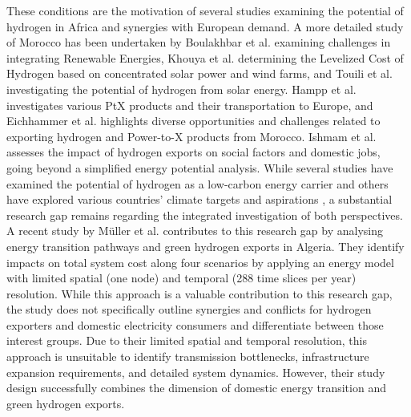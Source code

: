 These conditions are the motivation of several studies \cite{vanWijk2021, AbouSeada2022, vanderZwaan2021, Schellekens2010, Cavana2021, Touili2022, Timmerberg2019a, Sens2022, Franzmann2023} examining the potential of hydrogen in Africa and synergies with European demand. A more detailed study of Morocco has been undertaken by Boulakhbar et al.\cite{Boulakhbar2020} examining challenges in integrating Renewable Energies, Khouya et al.\cite{Khouya2020} determining the Levelized Cost of Hydrogen based on concentrated solar power and wind farms, and Touili et al.\cite{Touili2018} investigating the potential of hydrogen from solar energy. Hampp et al.\cite{Hampp2023} investigates various PtX products and their transportation to Europe, and Eichhammer et al. \cite{Eichhammer2019} highlights diverse opportunities and challenges related to exporting hydrogen and Power-to-X products from Morocco. Ishmam et al. \cite{Ishmam2024} assesses the impact of hydrogen exports on social factors and domestic jobs, going beyond a simplified energy potential analysis.
While several studies \cite{Hampp2023, AbouSeada2022, vanWijk2021} have examined the potential of hydrogen as a low-carbon energy carrier and others have explored various countries' climate targets and aspirations \cite{Boulakhbar2020}, a substantial research gap remains regarding the integrated investigation of both perspectives. 
A recent study by Müller et al.\cite{Muller2024} contributes to this research gap by analysing energy transition pathways and green hydrogen exports in Algeria. They identify impacts on total system cost along four scenarios by applying an energy model with limited spatial (one node) and temporal (288 time slices per year) resolution. While this approach is a valuable contribution to this research gap, the study does not specifically outline synergies and conflicts for hydrogen exporters and domestic electricity consumers and differentiate between those interest groups. 
Due to their limited spatial and temporal resolution, this approach is unsuitable to identify transmission bottlenecks, infrastructure expansion requirements, and detailed system dynamics. However, their study design successfully combines the dimension of domestic energy transition and green hydrogen exports.

